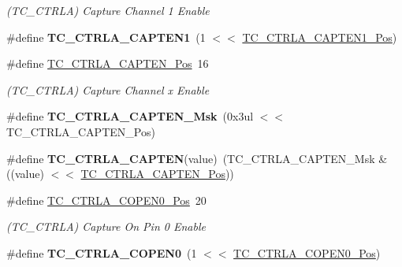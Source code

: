 \begin{DoxyCompactItemize}
\begin{DoxyCompactList}\small\item\em (T\+C\+\_\+\+C\+T\+R\+L\+A) Capture Channel 1 Enable \end{DoxyCompactList}\item 
\hypertarget{group___s_a_m_l21___t_c_ga0c11d0a219a236c56cce2fdff50fa53a}{}\#define {\bfseries T\+C\+\_\+\+C\+T\+R\+L\+A\+\_\+\+C\+A\+P\+T\+E\+N1}~(1 $<$$<$ \hyperlink{group___s_a_m_l21___t_c_ga88b8bd9d9ce085cbf8aa64d5e34d5c05}{T\+C\+\_\+\+C\+T\+R\+L\+A\+\_\+\+C\+A\+P\+T\+E\+N1\+\_\+\+Pos})\label{group___s_a_m_l21___t_c_ga0c11d0a219a236c56cce2fdff50fa53a}

\item 
\hypertarget{group___s_a_m_l21___t_c_ga474998c79a6a230c4e6f0856faa3075d}{}\#define \hyperlink{group___s_a_m_l21___t_c_ga474998c79a6a230c4e6f0856faa3075d}{T\+C\+\_\+\+C\+T\+R\+L\+A\+\_\+\+C\+A\+P\+T\+E\+N\+\_\+\+Pos}~16\label{group___s_a_m_l21___t_c_ga474998c79a6a230c4e6f0856faa3075d}

\begin{DoxyCompactList}\small\item\em (T\+C\+\_\+\+C\+T\+R\+L\+A) Capture Channel x Enable \end{DoxyCompactList}\item 
\hypertarget{group___s_a_m_l21___t_c_ga02145d2643c9ef3303f0f185f8134d9d}{}\#define {\bfseries T\+C\+\_\+\+C\+T\+R\+L\+A\+\_\+\+C\+A\+P\+T\+E\+N\+\_\+\+Msk}~(0x3ul $<$$<$ T\+C\+\_\+\+C\+T\+R\+L\+A\+\_\+\+C\+A\+P\+T\+E\+N\+\_\+\+Pos)\label{group___s_a_m_l21___t_c_ga02145d2643c9ef3303f0f185f8134d9d}

\item 
\hypertarget{group___s_a_m_l21___t_c_gad6ff625fdfbbc593ec094590252536de}{}\#define {\bfseries T\+C\+\_\+\+C\+T\+R\+L\+A\+\_\+\+C\+A\+P\+T\+E\+N}(value)~(T\+C\+\_\+\+C\+T\+R\+L\+A\+\_\+\+C\+A\+P\+T\+E\+N\+\_\+\+Msk \& ((value) $<$$<$ \hyperlink{group___s_a_m_l21___t_c_ga474998c79a6a230c4e6f0856faa3075d}{T\+C\+\_\+\+C\+T\+R\+L\+A\+\_\+\+C\+A\+P\+T\+E\+N\+\_\+\+Pos}))\label{group___s_a_m_l21___t_c_gad6ff625fdfbbc593ec094590252536de}

\item 
\hypertarget{group___s_a_m_l21___t_c_gadb84f4e184ac5ca80f79f5a41736eb16}{}\#define \hyperlink{group___s_a_m_l21___t_c_gadb84f4e184ac5ca80f79f5a41736eb16}{T\+C\+\_\+\+C\+T\+R\+L\+A\+\_\+\+C\+O\+P\+E\+N0\+\_\+\+Pos}~20\label{group___s_a_m_l21___t_c_gadb84f4e184ac5ca80f79f5a41736eb16}

\begin{DoxyCompactList}\small\item\em (T\+C\+\_\+\+C\+T\+R\+L\+A) Capture On Pin 0 Enable \end{DoxyCompactList}\item 
\hypertarget{group___s_a_m_l21___t_c_gafaabef8e848d4170e388cb337c9f2fa0}{}\#define {\bfseries T\+C\+\_\+\+C\+T\+R\+L\+A\+\_\+\+C\+O\+P\+E\+N0}~(1 $<$$<$ \hyperlink{group___s_a_m_l21___t_c_gadb84f4e184ac5ca80f79f5a41736eb16}{T\+C\+\_\+\+C\+T\+R\+L\+A\+\_\+\+C\+O\+P\+E\+N0\+\_\+\+Pos})\label{group___s_a_m_l21___t_c_gafaabef8e848d4170e388cb337c9f2fa0}


\end{DoxyCompactItemize}
